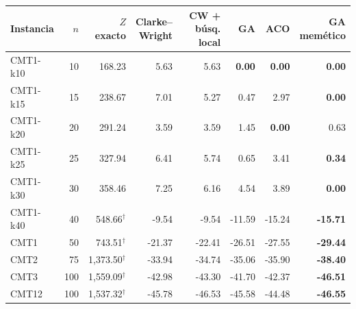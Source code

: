 \begin{tabular}{lrrrrrrr}
\toprule
Instancia & $n$ & $Z$ exacto & \makecell{Clarke--\\Wright} & \makecell{CW +\\búsq. local} & GA & ACO & \makecell{GA\\memético} \\
\midrule
CMT1-k10 & 10 & 168.23 & 5.63 & 5.63 & \textbf{0.00} & \textbf{0.00} & \textbf{0.00} \\
CMT1-k15 & 15 & 238.67 & 7.01 & 5.27 & 0.47 & 2.97 & \textbf{0.00} \\
CMT1-k20 & 20 & 291.24 & 3.59 & 3.59 & 1.45 & \textbf{0.00} & 0.63 \\
CMT1-k25 & 25 & 327.94 & 6.41 & 5.74 & 0.65 & 3.41 & \textbf{0.34} \\
CMT1-k30 & 30 & 358.46 & 7.25 & 6.16 & 4.54 & 3.89 & \textbf{0.00} \\
\midrule
CMT1-k40 & 40 & 548.66$^\dagger$ & -9.54 & -9.54 & -11.59 & -15.24 & \textbf{-15.71} \\
CMT1 & 50 & 743.51$^\dagger$ & -21.37 & -22.41 & -26.51 & -27.55 & \textbf{-29.44} \\
CMT2 & 75 & 1,373.50$^\dagger$ & -33.94 & -34.74 & -35.06 & -35.90 & \textbf{-38.40} \\
CMT3 & 100 & 1,559.09$^\dagger$ & -42.98 & -43.30 & -41.70 & -42.37 & \textbf{-46.51} \\
CMT12 & 100 & 1,537.32$^\dagger$ & -45.78 & -46.53 & -45.58 & -44.48 & \textbf{-46.55} \\
\bottomrule
\end{tabular}
